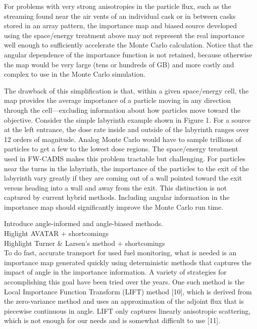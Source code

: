\documentclass[12pt]{article}
\begin{document}
For problems with very strong anisotropies in the particle flux, such as the streaming found near the air vents of an individual cask or in between casks stored in an array pattern, the importance map and biased source developed using the space/energy treatment above may not represent the real importance well enough to sufficiently accelerate the Monte Carlo calculation. Notice that the angular dependence of the importance function is not retained, because otherwise the map would be very large (tens or hundreds of GB) and more costly and complex to use in the Monte Carlo simulation. 

The drawback of this simplification is that, within a given space/energy cell, the map provides the average importance of a particle moving in any direction through the cell—excluding information about how particles move toward the objective. Consider the simple labyrinth example shown in Figure 1. For a source at the left entrance, the dose rate inside and outside of the labyrinth ranges over 12 orders of magnitude. Analog Monte Carlo would have to sample trillions of particles to get a few to the lowest dose regions. The space/energy treatment used in FW-CADIS makes this problem tractable but challenging. For particles near the turns in the labyrinth, the importance of the particles to the exit of the labyrinth vary greatly if they are coming out of a wall pointed toward the exit versus heading into a wall and away from the exit. This distinction is not captured by current hybrid methods. Including angular information in the importance map should significantly improve the Monte Carlo run time. 

Introduce angle-informed and angle-biased methods. \\
Higlight AVATAR + shortcomings \\
Highlight Turner \& Larsen's method + shortcomings\\

To do fast, accurate transport for used fuel monitoring, what is needed is an importance map generated quickly using deterministic methods that captures the impact of angle in the importance information. A variety of strategies for accomplishing this goal have been tried over the years. One such method is the Local Importance Function Transform (LIFT) method [10], which is derived from the zero-variance method and  uses an approximation of the adjoint flux that is piecewise continuous in angle. LIFT only captures linearly anisotropic scattering, which is not enough for our needs and is somewhat difficult to use [11].
\end{document}
